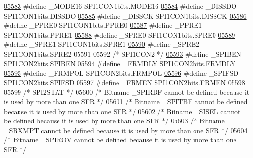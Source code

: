 \begin{DoxyCode}
\hypertarget{a00009_source_l05583}{}\hyperlink{a00009_a4d23f23f2aa0445026181db6ac4f2fc7}{05583} \textcolor{preprocessor}{#define \_MODE16 SPI1CON1bits.MODE16}
\hypertarget{a00009_source_l05584}{}\hyperlink{a00009_a8e70c1ec6c628abccd7efaf0a5a68163}{05584} \textcolor{preprocessor}{#define \_DISSDO SPI1CON1bits.DISSDO}
\hypertarget{a00009_source_l05585}{}\hyperlink{a00009_a6b68bc451b7f5aa78e5991af22fc39a0}{05585} \textcolor{preprocessor}{#define \_DISSCK SPI1CON1bits.DISSCK}
\hypertarget{a00009_source_l05586}{}\hyperlink{a00009_a634e7188bd7a9d19f7a896b8c2220136}{05586} \textcolor{preprocessor}{#define \_PPRE0 SPI1CON1bits.PPRE0}
\hypertarget{a00009_source_l05587}{}\hyperlink{a00009_a961057d8de29befd974b2d51240d34b7}{05587} \textcolor{preprocessor}{#define \_PPRE1 SPI1CON1bits.PPRE1}
\hypertarget{a00009_source_l05588}{}\hyperlink{a00009_ae64427bd69b9407d26ca88b4879202fd}{05588} \textcolor{preprocessor}{#define \_SPRE0 SPI1CON1bits.SPRE0}
\hypertarget{a00009_source_l05589}{}\hyperlink{a00009_ac5abdcba1b5bb90bdd2ec147b48a40db}{05589} \textcolor{preprocessor}{#define \_SPRE1 SPI1CON1bits.SPRE1}
\hypertarget{a00009_source_l05590}{}\hyperlink{a00009_a421cd354293bbade98515ca05599a152}{05590} \textcolor{preprocessor}{#define \_SPRE2 SPI1CON1bits.SPRE2}
05591 
05592 \textcolor{comment}{/* SPI1CON2 */}
\hypertarget{a00009_source_l05593}{}\hyperlink{a00009_a92d53bd4032c4f2912aeb9dcd1cb130a}{05593} \textcolor{preprocessor}{#define \_SPIBEN SPI1CON2bits.SPIBEN}
\hypertarget{a00009_source_l05594}{}\hyperlink{a00009_ab36d378c8fc408680ba52c9a29a0102a}{05594} \textcolor{preprocessor}{#define \_FRMDLY SPI1CON2bits.FRMDLY}
\hypertarget{a00009_source_l05595}{}\hyperlink{a00009_ac9de9fc6ebf551217feb55552503c659}{05595} \textcolor{preprocessor}{#define \_FRMPOL SPI1CON2bits.FRMPOL}
\hypertarget{a00009_source_l05596}{}\hyperlink{a00009_ad2e48ee24cf208254edfbddfcc85b47a}{05596} \textcolor{preprocessor}{#define \_SPIFSD SPI1CON2bits.SPIFSD}
\hypertarget{a00009_source_l05597}{}\hyperlink{a00009_a37a0230c3be9e4f9274e2ff908dc0684}{05597} \textcolor{preprocessor}{#define \_FRMEN SPI1CON2bits.FRMEN}
05598 
05599 \textcolor{comment}{/* SPI2STAT */}
05600 \textcolor{comment}{/* Bitname \_SPIRBF cannot be defined because it is used by more than one SFR */}
05601 \textcolor{comment}{/* Bitname \_SPITBF cannot be defined because it is used by more than one SFR */}
05602 \textcolor{comment}{/* Bitname \_SISEL cannot be defined because it is used by more than one SFR */}
05603 \textcolor{comment}{/* Bitname \_SRXMPT cannot be defined because it is used by more than one SFR */}
05604 \textcolor{comment}{/* Bitname \_SPIROV cannot be defined because it is used by more than one SFR */}

\end{DoxyCode}
